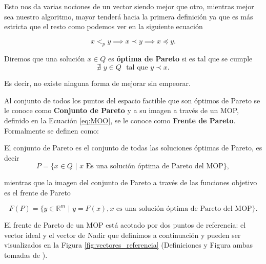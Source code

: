 Esto nos da varias nociones de un vector siendo mejor que otro, mientras mejor sea nuestro algoritmo, mayor tenderá hacia la primera definición ya que es más estricta que el resto como podemos ver en la siguiente ecuación

\begin{equation} \label{eq:contencion_def_pareto}
    x <_p  y \implies x \prec y \implies x \preceq y. \nonumber
\end{equation}

\begin{definition}
Diremos que una solución $x\in Q$ es \textbf{óptima de Pareto} si es tal que se cumple
\begin{equation} \label{eq:opt_pareto}
    \nexists \,\, y\in Q \,\, \text{ tal que } y\prec x. \nonumber
\end{equation}

Es decir, no existe ninguna forma de mejorar sin empeorar.
\end{definition}

\begin{definition}
Al conjunto de todos los puntos del espacio factible que son óptimos de Pareto se le conoce como \textbf{Conjunto de Pareto} y a su imagen a través de un MOP, definido en la Ecuación \ref{eq:MOO}, se le conoce como \textbf{Frente de Pareto}. Formalmente se definen como:

El conjunto de Pareto es el conjunto de todas las soluciones óptimas de Pareto, es decir
\begin{equation} \label{eq:pareto_set}
    P=\{x\in Q \, \, \big| \, \, x \text{ Es una solución óptima de Pareto del MOP}\}, \nonumber
\end{equation}

mientras que la imagen del conjunto de Pareto a través de las funciones objetivo es el frente de Pareto 

\begin{equation} \label{eq:pareto_front}
F(P)=\{y\in \mathbb{R}^m \, \, \big| \, \, y=F(x), x \text{ es una solución óptima de Pareto del MOP}\}.    \nonumber
\end{equation}

\end{definition}

El frente de Pareto de un MOP está acotado por dos puntos de referencia: el vector ideal y el vector de Nadir que definimos a continuación y pueden ser visualizados en la Figura \ref{fig:vectores_referencia} (Definiciones y Figura ambas tomadas de \cite{tesis_phd_guillermo}).


